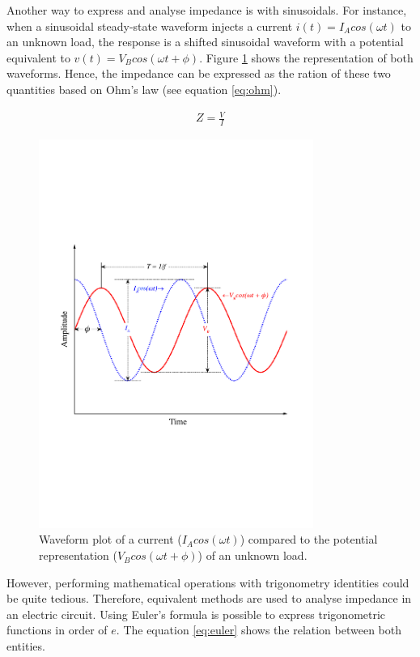Another way to express and analyse impedance is with sinusoidals. For instance, when a sinusoidal steady-state waveform injects a current $i(t) = I_A cos(\omega t)$ to an unknown load, the response is a shifted sinusoidal waveform with a potential equivalent to $v(t) = V_B cos(\omega t + \phi)$. Figure \ref{fig:impedance wave} shows the representation of both waveforms. Hence, the impedance can be expressed as the ration of these two quantities based on Ohm's law (see equation \ref{eq:ohm}).

\begin{align}
	\label{eq:ohm}
	Z = \frac{V}{I}
\end{align}

\begin{figure}[!htpb]
	\centering
	\includegraphics[width=0.8\textwidth,keepaspectratio, trim={0cm 0cm 0cm 0cm},clip]{figure_1}    
	\caption[Impedance waveforms]{Waveform plot of a current ($I_A cos (\omega t)$) compared to the potential representation ($V_B cos (\omega t + \phi)$) of an unknown load.}
	\label{fig:impedance wave}
\end{figure}


However, performing mathematical operations with trigonometry identities could be quite tedious. Therefore, equivalent methods are used to analyse impedance in an electric circuit. Using Euler's formula is possible to express trigonometric functions in order of $e$. The equation \ref{eq:euler} shows the relation between both entities.

